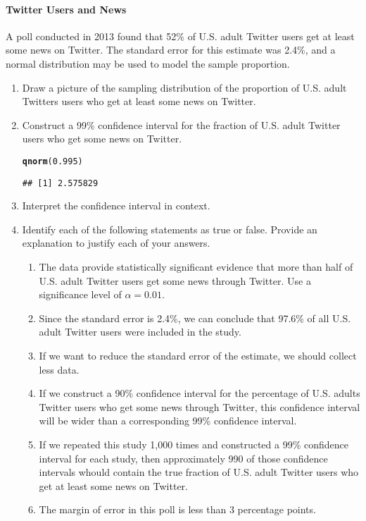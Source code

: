 \documentclass[10pt]{article}\usepackage[]{graphicx}\usepackage[]{color}
\makeatletter
\newcommand{\hlnum}[1]{\textcolor[rgb]{0.686,0.059,0.569}{#1}}%
\newcommand{\hlstd}[1]{\textcolor[rgb]{0.345,0.345,0.345}{#1}}%
\newcommand{\hlkwd}[1]{\textcolor[rgb]{0.737,0.353,0.396}{\textbf{#1}}}%
\newenvironment{kframe}{%
 \def\at@end@of@kframe{}%
 \ifinner\ifhmode%
  \def\at@end@of@kframe{\end{minipage}}%
  \begin{minipage}{\columnwidth}%
 \fi\fi%
 \def\FrameCommand##1{\hskip\@totalleftmargin \hskip-\fboxsep
 \colorbox{shadecolor}{##1}\hskip-\fboxsep
     \hskip-\linewidth \hskip-\@totalleftmargin \hskip\columnwidth}%
 \MakeFramed {\advance\hsize-\width
   \@totalleftmargin\z@ \linewidth\hsize
   \@setminipage}}%
 {\par\unskip\endMakeFramed%
 \at@end@of@kframe}
\newenvironment{knitrout}{}{} %
\makeatother
\begin{document}
\paragraph{Twitter Users and News} A poll conducted in 2013 found that 52\% of U.S. adult Twitter users get at least some news on Twitter. The standard error for this estimate was 2.4\%, and a normal distribution may be used to model the sample proportion. 
\begin{enumerate}
  \itemsep0.5in
  \item Draw a picture of the sampling distribution of the proportion of U.S. adult Twitters users who get at least some news on Twitter. 
  \item Construct a 99\% confidence interval for the fraction of U.S. adult Twitter users who get some news on Twitter.
\begin{knitrout}
\color{fgcolor}\begin{kframe}
\begin{alltt}
\hlkwd{qnorm}\hlstd{(}\hlnum{0.995}\hlstd{)}
\end{alltt}
\begin{verbatim}
## [1] 2.575829
\end{verbatim}
\end{kframe}
\end{knitrout}


  \item Interpret the confidence interval in context.
  \item Identify each of the following statements as true or false. Provide an explanation to justify each of your answers.
  \begin{enumerate}
    \itemsep0.5in
    \item The data provide statistically significant evidence that more than half of U.S. adult Twitter users get some news through Twitter. Use a significance level of $\alpha = 0.01$.
    \item Since the standard error is 2.4\%, we can conclude that 97.6\% of all U.S. adult Twitter users were included in the study.
    \item If we want to reduce the standard error of the estimate, we should collect less data.
    \item If we construct a 90\% confidence interval for the percentage of U.S. adults Twitter users who get some news through Twitter, this confidence interval will be wider than a corresponding 99\% confidence interval.
    \item If we repeated this study 1,000 times and constructed a 99\% confidence interval for each study, then approximately 990 of those confidence intervals whould contain the true fraction of U.S. adult Twitter users who get at least some news on Twitter. 
    \item The margin of error in this poll is less than 3 percentage points.
  \end{enumerate}
\end{enumerate}
\end{document}
